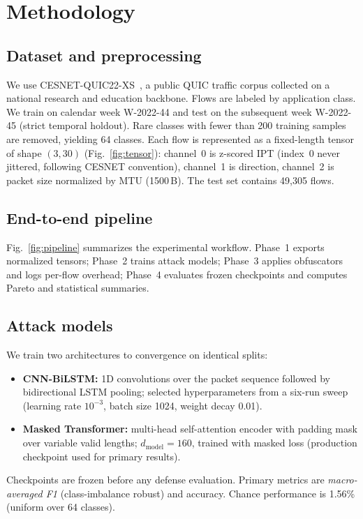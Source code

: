 \section{Methodology}
\label{sec:methods}

\subsection{Dataset and preprocessing}

We use CESNET-QUIC22-XS~\cite{cesnet_quic22}, a public QUIC traffic corpus collected
on a national research and education backbone. Flows are labeled by application class.
We train on calendar week W-2022-44 and test on the subsequent week W-2022-45
(strict temporal holdout). Rare classes with fewer than 200 training samples are
removed, yielding 64 classes. Each flow is represented as a fixed-length tensor of
shape $(3, 30)$ (Fig.~\ref{fig:tensor}): channel~0 is z-scored IPT (index~0 never
jittered, following CESNET convention), channel~1 is direction, channel~2 is packet
size normalized by MTU (1500\,B). The test set contains 49{,}305 flows.



\subsection{End-to-end pipeline}

Fig.~\ref{fig:pipeline} summarizes the experimental workflow. Phase~1 exports
normalized tensors; Phase~2 trains attack models; Phase~3 applies obfuscators and
logs per-flow overhead; Phase~4 evaluates frozen checkpoints and computes Pareto and
statistical summaries.



\subsection{Attack models}

We train two architectures to convergence on identical splits:
\begin{itemize}
  \item \textbf{CNN-BiLSTM:} 1D convolutions over the packet sequence followed by
        bidirectional LSTM pooling; selected hyperparameters from a six-run sweep
        (learning rate $10^{-3}$, batch size 1024, weight decay 0.01).
  \item \textbf{Masked Transformer:} multi-head self-attention encoder with padding
        mask over variable valid lengths; $d_{\mathrm{model}}=160$, trained with
        masked loss (production checkpoint used for primary results).
\end{itemize}
Checkpoints are frozen before any defense evaluation. Primary metrics are
\emph{macro-averaged F1} (class-imbalance robust) and accuracy. Chance performance
is 1.56\% (uniform over 64 classes).

